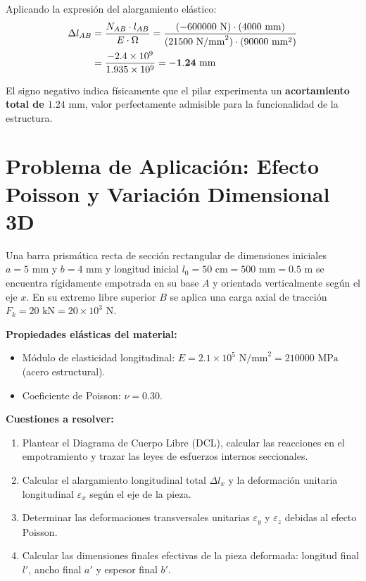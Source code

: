 Aplicando la expresión del alargamiento elástico:
\begin{align}
    \Delta l_{AB} & = \frac{N_{AB} \cdot l_{AB}}{E \cdot \Omega} = \frac{(-600000\text{ N}) \cdot (4000\text{ mm})}{(21500\text{ N/mm}^2) \cdot (90000\text{ mm}^2)} \notag \\
                  & = \frac{-2.4 \times 10^9}{1.935 \times 10^9} = \mathbf{-1.24\text{ mm}}
\end{align}

El signo negativo indica físicamente que el pilar experimenta un \textbf{acortamiento total de $1.24\text{ mm}$}, valor perfectamente admisible para la funcionalidad de la estructura.

\section{Problema de Aplicación: Efecto Poisson y Variación Dimensional 3D}

\begin{tcolorbox}[colback=blue!5!white,colframe=blue!75!black,title=\textbf{Problema 7 (Ejemplo de Clase): Barra Prismática con Deformación Transversal de Poisson}]
    Una barra prismática recta de sección rectangular de dimensiones iniciales $a = 5\text{ mm}$ y $b = 4\text{ mm}$ y longitud inicial $l_0 = 50\text{ cm} = 500\text{ mm} = 0.5\text{ m}$ se encuentra rígidamente empotrada en su base $A$ y orientada verticalmente según el eje $x$. En su extremo libre superior $B$ se aplica una carga axial de tracción $F_k = 20\text{ kN} = 20 \times 10^3\text{ N}$.

    \textbf{Propiedades elásticas del material:}
    \begin{itemize}
        \item Módulo de elasticidad longitudinal: $E = 2.1 \times 10^5\text{ N/mm}^2 = 210000\text{ MPa}$ (acero estructural).
        \item Coeficiente de Poisson: $\nu = 0.30$.
    \end{itemize}

    \textbf{Cuestiones a resolver:}
    \begin{enumerate}[label=\textbf{\Alph*)}]
        \item Plantear el Diagrama de Cuerpo Libre (DCL), calcular las reacciones en el empotramiento y trazar las leyes de esfuerzos internos seccionales.
        \item Calcular el alargamiento longitudinal total $\Delta l_x$ y la deformación unitaria longitudinal $\varepsilon_x$ según el eje de la pieza.
        \item Determinar las deformaciones transversales unitarias $\varepsilon_y$ y $\varepsilon_z$ debidas al efecto Poisson.
        \item Calcular las dimensiones finales efectivas de la pieza deformada: longitud final $l'$, ancho final $a'$ y espesor final $b'$.
    \end{enumerate}
\end{tcolorbox}

